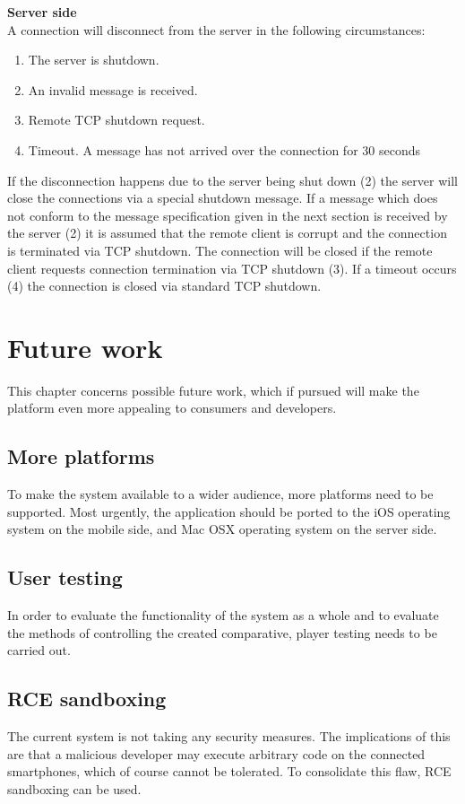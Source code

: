 \documentclass{article}
\begin{document}
\begin{description}
\item \textbf{Server side}\\A connection will disconnect from the server in the following circumstances:
\end{description}
\begin{enumerate}
\item The server is shutdown.
\item An invalid message is received.
\item Remote TCP shutdown request.
\item Timeout. A message has not arrived over the connection for 30 seconds
\end{enumerate}
If the disconnection happens due to the server being shut down (2) the server will close the
connections via a special shutdown message. If a message which does not conform to the
message specification given in the next section is received by the server (2) it is assumed that the
remote client is corrupt and the connection is terminated via TCP shutdown. The connection will
be closed if the remote client requests connection termination via TCP shutdown (3). If a timeout
occurs (4) the connection is closed via standard TCP shutdown.

\section{Future work}
This chapter concerns possible future work, which if pursued will make the platform even more
appealing to consumers and developers.

\subsection{More platforms}
To make the system available to a wider audience, more platforms need to be supported. Most
urgently, the application should be ported to the iOS operating system on the mobile side, and
Mac OSX operating system on the server side.

\subsection{User testing}
In order to evaluate the functionality of the system as a whole and to evaluate the methods of
controlling the created comparative, player testing needs to be carried out.

\subsection{RCE sandboxing}
The current system is not taking any security measures. The implications of this are that a
malicious developer may execute arbitrary code on the connected smartphones, which of course
cannot be tolerated. To consolidate this flaw, RCE sandboxing can be used.
\end{document}
